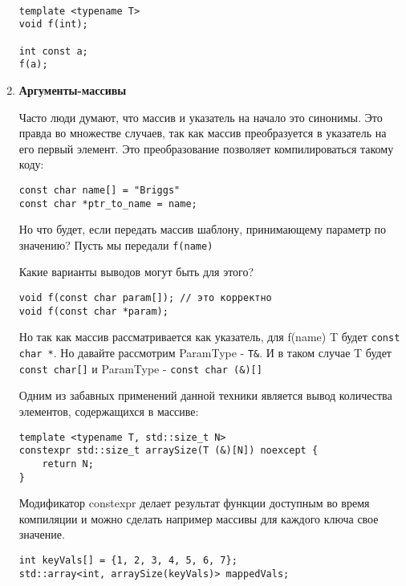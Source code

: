 \begin{enumerate}
\begin{verbatim}

template <typename T>
void f(int);

int const a;
f(a);
\end{verbatim}
				
				\item \textbf{Аргументы-массивы}
				
				Часто люди думают, что массив и указатель на начало это синонимы. Это правда во множестве случаев, так как массив преобразуется в указатель на его первый элемент. Это преобразование позволяет компилироваться такому коду:
				
\begin{verbatim}
const char name[] = "Briggs"
const char *ptr_to_name = name;
\end{verbatim}
				
				Но что будет, если передать массив шаблону, принимающему параметр по значению?
				Пусть мы передали \texttt{f(name)}
				
				Какие варианты выводов могут быть для этого?
				
\begin{verbatim}
void f(const char param[]); // это корректно
void f(const char *param);
\end{verbatim}
				
				Но так как массив рассматривается как указатель, для f(name) T будет \texttt{const char *}.
				Но давайте рассмотрим ParamType - \texttt{T&}. И в таком случае T будет \texttt{const char[]} и ParamType -  \texttt{const char (&)[]}
				
				Одним из забавных применений данной техники является вывод количества элементов, содержащихся в массиве:
				
\begin{verbatim}
template <typename T, std::size_t N>
constexpr std::size_t arraySize(T (&)[N]) noexcept {
	return N;
}
\end{verbatim}
				Модификатор constexpr делает результат функции доступным во время компиляции и можно сделать например массивы для каждого ключа свое значение.
\begin{verbatim}
int keyVals[] = {1, 2, 3, 4, 5, 6, 7};
std::array<int, arraySize(keyVals)> mappedVals;
\end{verbatim}
				

\end{enumerate}
